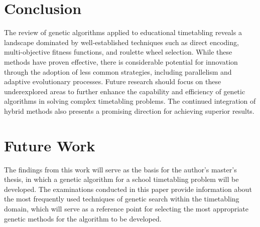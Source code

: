 \documentclass[sigconf]{acmart}
\begin{document}
\section{Conclusion}
The review of genetic algorithms applied to educational timetabling reveals a
landscape dominated by well-established techniques such as direct encoding,
multi-objective fitness functions, and roulette wheel selection. While these
methods have proven effective, there is considerable potential for innovation
through the adoption of less common strategies, including parallelism and 
adaptive evolutionary processes. %
Future research should focus on these underexplored areas to further enhance
the capability and efficiency of genetic algorithms in solving complex
timetabling problems. The continued integration of hybrid methods also presents
a promising direction for achieving superior results.

\section{Future Work}
The findings from this work will serve as the basis for the author's master's
thesis, in which a genetic algorithm for a school timetabling problem will be
developed.
The examinations conducted in this paper provide information about the most
frequently used techniques of genetic search within the timetabling domain,
which will serve as a reference point for selecting the most appropriate
genetic methods for the algorithm to be developed.









\end{document}
